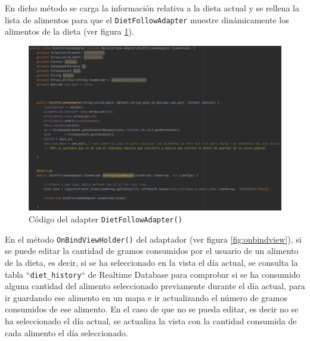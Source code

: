En dicho método se carga la información relativa a la dieta actual y se rellena la lista de alimentos para que el \texttt{DietFollowAdapter} muestre dinámicamente los alimentos de la dieta (ver figura \ref{fig:dietfollowedadapter}).

\begin{figure}[H]
    \centering
    \includegraphics[width=\textwidth]{Images/Capitulo7/dietfollowedadapter.png}
    \caption{Código del adapter \texttt{DietFollowAdapter()}}
    \label{fig:dietfollowedadapter}
\end{figure}

En el método \texttt{OnBindViewHolder()} del adaptador (ver figura \ref{fig:onbindview}), si se puede editar la cantidad de gramos consumidos por el usuario de un alimento de la dieta, es decir, si se ha seleccionado en la vista el día actual, se consulta la tabla ``\texttt{diet\_history}`` de Realtime Database para comprobar si se ha consumido alguna cantidad del alimento seleccionado previamente durante el día actual, para ir guardando ese alimento en un mapa e ir actualizando el número de gramos consumidos de ese alimento.
En el caso de que no se pueda editar, es decir no se ha seleccionado el día actual, se actualiza la vista con la cantidad consumida de cada alimento el día seleccionado.

